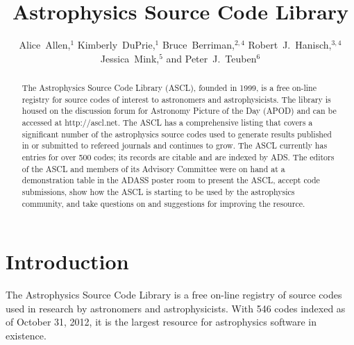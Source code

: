 
\resetcounters


\title{Astrophysics Source Code Library}

\author{Alice~Allen,$^1$ Kimberly~DuPrie,$^1$ Bruce~Berriman,$^{2,4}$ Robert~J.~Hanisch,$^{3,4}$ Jessica~Mink,$^5$ and Peter~J.~Teuben$^6$
}


\begin{abstract}

The Astrophysics Source Code Library (ASCL), founded in 1999, is a free on-line registry for source codes of interest to astronomers and astrophysicists. The library is housed on the discussion forum for Astronomy Picture of the Day (APOD) and can be accessed at http://ascl.net. The ASCL has a comprehensive listing that covers a significant number of the astrophysics source codes used to generate results published in or submitted to refereed journals and continues to grow. The ASCL currently has entries for over 500 codes; its records are citable and are indexed by ADS. The editors of the ASCL and members of its Advisory Committee were on hand at a demonstration table in the ADASS poster room to present the ASCL, accept code submissions, show how the ASCL is starting to be used by the astrophysics community, and take questions on and suggestions for improving the resource.
\end{abstract}

\section{Introduction}

The Astrophysics Source Code Library is a free on-line registry of source codes used in research by astronomers and astrophysicists. With 546 codes indexed as of October 31, 2012, it is the largest resource for astrophysics software in existence. 

